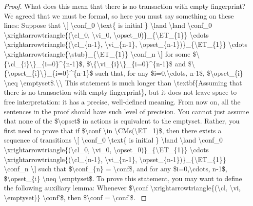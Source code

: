 \begin{proof}
\ac{What does this mean that there is no transaction with empty fingerprint? 
We agreed that we must be formal, so here you must say something on these lines: 
Suppose that 
\[
\conf_0 \text{ is initial } \land  \land \conf_0 \xrightarrowtriangle{(\cl_0, \vi_0, \opset_0)}_{\ET_{1}} \cdots \xrightarrowtriangle{(\cl_{n-1}, \vi_{n-1}, 
\opset_{n-1})}_{\ET_{1}} \cdots \xrightarrowtriangle{\stub}_{\ET_{1}} \conf_n
    \]
for some $\{\cl_{i}\}_{i=0}^{n-1}$, $\{\vi_{i}\}_{i=0}^{n-1}$ and $\{\opset_{i}\}_{i=0}^{n-1}$ such that, 
for any $i=0,\cdots, n-1$, $\opset_{i} \neq \emptyset$.\\
This statement is much longer than \textbf{Assuming that there is no transaction with empty fingerprint}, but it 
does not leave space to free interpretation: it has a precise, well-defined meaning. From now on, all the sentences 
in the proof should have such level of precision.}
\ac{You cannot just assume that none of the $\opset$ in actions is equivalent to the emptyset. 
Rather, you first need to prove that if $\conf \in \CMs(\ET_1)$, then there exists a sequence of transitions 
\[
\conf_0 \text{ is initial } \land  \land \conf_0 \xrightarrowtriangle{(\cl_0, \vi_0, \opset_0)}_{\ET_{1}} \cdots \xrightarrowtriangle{(\cl_{n-1}, \vi_{n-1}, 
\opset_{n-1})}_{\ET_{1}} \conf_n
    \]
such that $\conf_{n} = \conf$, and for any $i=0,\cdots, n-1$, $\opset_{i} \neq \emptyset$.
To prove this statement, you may want to define the following auxiliary lemma: 
Whenever $\conf \xrightarrowtriangle{(\cl, \vi, \emptyset)} \conf'$, then $\conf = \conf'$. }


\end{proof}
